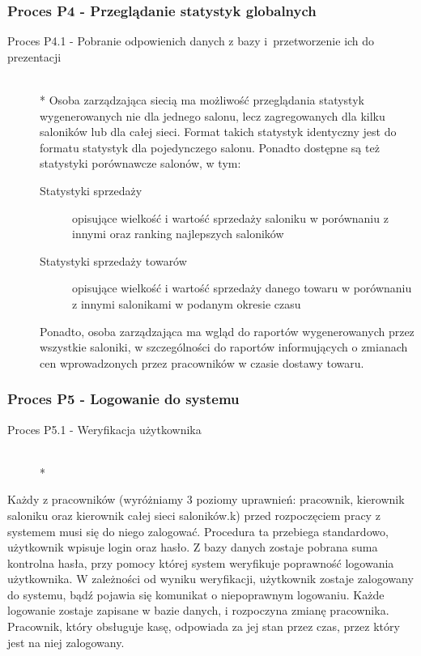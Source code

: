 \subsubsection{Proces P4 - Przeglądanie statystyk globalnych}
\begin{description}
\item[Proces P4.1 - Pobranie odpowienich danych z bazy i~przetworzenie ich do prezentacji] ~\\*
Osoba zarządzająca siecią ma możliwość przeglądania statystyk wygenerowanych nie dla jednego salonu, lecz zagregowanych dla kilku saloników lub dla całej sieci. Format takich statystyk identyczny jest do formatu statystyk dla pojedynczego salonu. Ponadto dostępne są też statystyki porównawcze salonów, w tym:
\begin{description}
\item[Statystyki sprzedaży] opisujące wielkość i wartość sprzedaży saloniku w porównaniu z innymi oraz ranking najlepszych saloników
\item[Statystyki sprzedaży towarów] opisujące wielkość i wartość sprzedaży danego towaru w porównaniu z innymi salonikami w podanym okresie czasu
\end{description}
Ponadto, osoba zarządzająca ma wgląd do raportów wygenerowanych przez wszystkie saloniki, w szczególności do raportów informujących o zmianach cen wprowadzonych przez pracowników w czasie dostawy towaru.
\end{description}
\subsubsection{Proces P5 - Logowanie do systemu}
\begin{description}
\item[Proces P5.1 - Weryfikacja użytkownika] ~\\*
\end{description}
Każdy z pracowników (wyróżniamy 3 poziomy uprawnień: pracownik, kierownik saloniku oraz kierownik całej sieci saloników.k) przed rozpoczęciem pracy z systemem musi się do niego zalogować. Procedura ta przebiega standardowo, użytkownik wpisuje login oraz hasło. Z bazy danych zostaje pobrana suma kontrolna hasła, przy pomocy której system weryfikuje poprawność logowania użytkownika. W zależności od wyniku weryfikacji, użytkownik zostaje zalogowany do systemu, bądź pojawia się komunikat o niepoprawnym logowaniu. Każde logowanie zostaje zapisane w bazie danych, i rozpoczyna zmianę pracownika. Pracownik, który obsługuje kasę, odpowiada za jej stan przez czas, przez który jest na niej zalogowany. 
